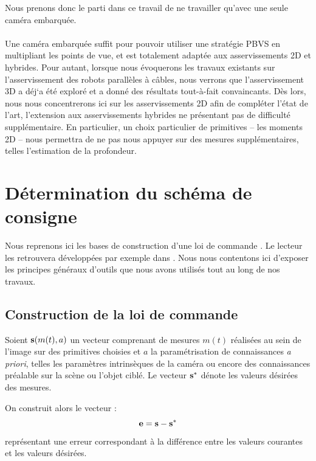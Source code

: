 Nous prenons donc le parti dans ce travail de ne travailler qu'avec une seule 
cam\'era embarqu\'ee.\\

\\

Une cam\'era embarqu\'ee suffit pour pouvoir utiliser une strat\'egie PBVS en 
multipliant les points de vue, et est totalement adapt\'ee aux asservissements 
2D et hybrides. Pour autant, lorsque nous \'evoquerons les travaux existants 
sur l'asservissement des robots parall\`eles \`a c\^ables, nous verrons que 
l'asservissement 3D a d\'ej`a \'et\'e explor\'e et a donn\'e des r\'esultats 
tout-\`a-fait convaincants. D\`es lors, nous nous concentrerons ici sur les 
asservissements 2D afin de compl\'eter l'\'etat de l'art, l'extension aux 
asservissements hybrides ne pr\'esentant pas de difficult\'e suppl\'ementaire. 
En particulier, un choix particulier de primitives -- les moments 2D -- nous 
permettra de ne pas nous appuyer sur des mesures suppl\'ementaires, telles 
l'estimation de la profondeur.

\section{D\'etermination du sch\'ema de consigne}\label{chap1-2}

Nous reprenons ici les bases de construction d'une loi de commande 
\cite{samson1991}. Le lecteur les retrouvera développées par exemple dans 
\cite{chaumette2008handbook}. Nous nous contentons ici d'exposer les principes 
généraux d'outils que nous avons utilisés tout au long de nos travaux.

\subsection{Construction de la loi de commande} \label{chap1-2-0}

Soient ${\bf s}(m(t), a)$ un vecteur comprenant de mesures $m(t)$ réalisées au 
sein de l'image sur des primitives choisies et $a$ la param\'etrisation de 
connaissances {\it a priori}, telles les param\`etres intrins\`eques de la 
cam\'era ou encore des connaissances pr\'ealable sur la sc\`ene ou l'objet 
cibl\'e. Le vecteur ${\bf s}^*$ d\'enote les valeurs désirées des mesures.

On construit alors le vecteur :
\begin{equation}
{\bf e} = {\bf s} - {\bf s}^*
\label{chap01:eq13}
\end{equation}
représentant une erreur correspondant \`a la différence entre les valeurs 
courantes et les valeurs désirées.


